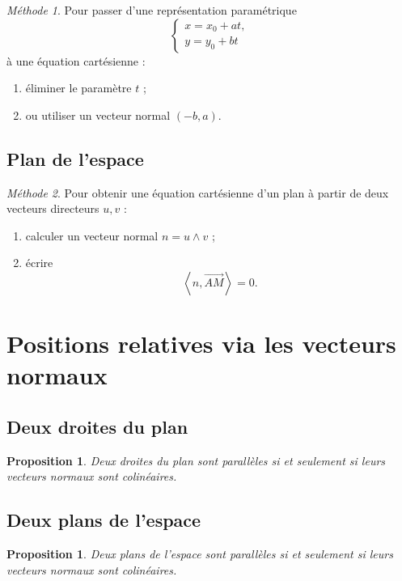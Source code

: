 \documentclass[11pt,a4paper]{article}
\newtheorem{proposition}[definition]{Proposition}
\theoremstyle{remark}
\newtheorem*{methode}{Méthode}
\newcommand{\scal}[2]{\left\langle #1,#2\right\rangle}
\begin{document}
\begin{methode}
Pour passer d’une représentation paramétrique
\[
\begin{cases}
x=x_0+at,\\
y=y_0+bt
\end{cases}
\]
à une équation cartésienne :
\begin{enumerate}
    \item éliminer le paramètre \(t\) ;
    \item ou utiliser un vecteur normal \((-b,a)\).
\end{enumerate}
\end{methode}

\subsection{Plan de l’espace}

\begin{methode}
Pour obtenir une équation cartésienne d’un plan à partir de deux vecteurs directeurs \(u,v\) :
\begin{enumerate}
    \item calculer un vecteur normal \(n=u\wedge v\) ;
    \item écrire
    \[
    \scal{n}{\overrightarrow{AM}}=0.
    \]
\end{enumerate}
\end{methode}

\section{Positions relatives via les vecteurs normaux}

\subsection{Deux droites du plan}

\begin{proposition}
Deux droites du plan sont parallèles si et seulement si leurs vecteurs normaux sont colinéaires.
\end{proposition}

\subsection{Deux plans de l’espace}

\begin{proposition}
Deux plans de l’espace sont parallèles si et seulement si leurs vecteurs normaux sont colinéaires.
\end{proposition}
\end{document}
